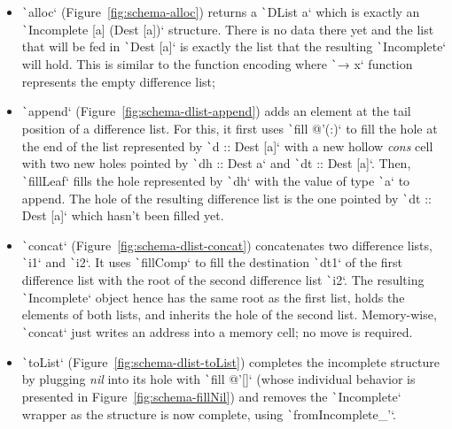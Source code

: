 \documentclass[english]{jflart}
\begin{document}


\begin{itemize}
  \item \texttt`alloc` (Figure~\ref{fig:schema-alloc}) returns a
    \texttt`DList a` which is exactly an
    \texttt`Incomplete [a] (Dest [a])` structure. There is no data
    there yet and the list that will be fed in \texttt`Dest [a]` is exactly the list that the
    resulting \texttt`Incomplete` will hold. This is
    similar to the function encoding where \texttt`\x → x` function represents the empty difference list;
    

  \item \texttt`append` (Figure~\ref{fig:schema-dlist-append}) adds an element at the tail
    position of a difference list. For this, it first uses
    \texttt`fill @'(:)` to fill the hole at the end of the list represented by
    \texttt`d :: Dest [a]` with a new hollow \emph{cons}
    cell with two new holes pointed by \texttt`dh :: Dest a` and \texttt`dt :: Dest [a]`. Then,
    \texttt`fillLeaf` fills the hole represented by
    \texttt`dh` with the value
    of type \texttt`a`
    to append. The hole of the resulting difference list is the one pointed by \texttt`dt :: Dest [a]` which hasn't been filled yet.

  \item \texttt`concat` (Figure~\ref{fig:schema-dlist-concat}) concatenates two difference lists,
    \texttt`i1` and \texttt`i2`. It uses \texttt`fillComp` to fill the destination \texttt`dt1`
    of the first difference list with the
    root of the second difference list \texttt`i2`. The resulting \texttt`Incomplete`
    object hence has the same root as the first list, holds the
    elements of both lists, and inherits the hole of the second list. Memory-wise,
    \texttt`concat` just writes an address into a memory cell; no move is
    required.

  \item \texttt`toList` (Figure~\ref{fig:schema-dlist-toList}) completes the incomplete structure by plugging \emph{nil} into its hole with \texttt`fill @'[]` (whose individual behavior is presented in Figure~\ref{fig:schema-fillNil}) and removes the \texttt`Incomplete` wrapper as the structure is now complete, using \texttt`fromIncomplete_'`.
\end{itemize}
\end{document}
